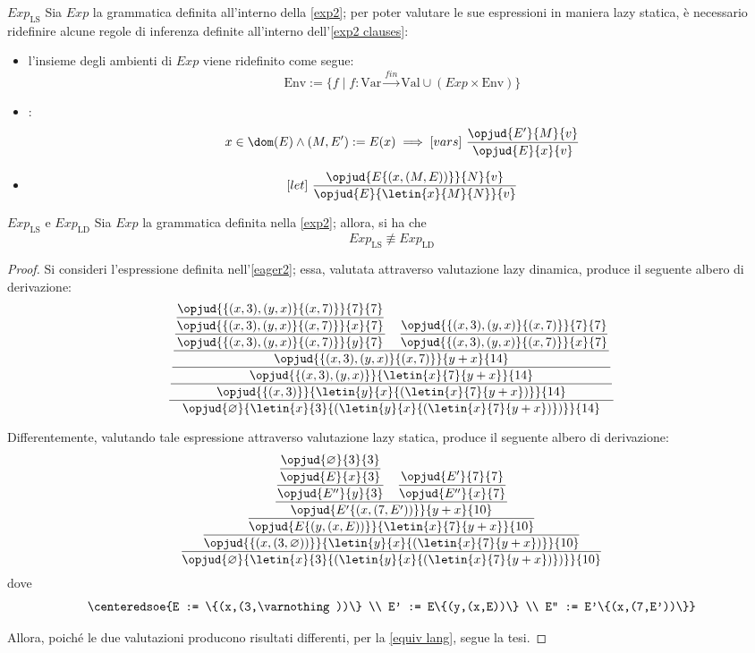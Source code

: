 \documentclass[a4paper, 12pt]{report}
\begin{document}
    \begin{framedprop}[label={exp ls}, breakable]{$Exp_\mathrm{LS}$}
        Sia $Exp$ la grammatica definita all'interno della \cref{exp2}; per poter valutare le sue espressioni in maniera lazy statica, è necessario ridefinire alcune regole di inferenza definite all'interno dell'\cref{exp2 clauses}:

        \begin{itemize}
            \item l'insieme degli ambienti di $Exp$ viene ridefinito come segue: $$\mathrm{Env} := \{f \mid f: \mathrm{Var} \xrightarrow{fin} \mathrm{Val} \cup (Exp \times \mathrm{Env}) \}$$
            \item {}: $$x \in \dom(E) \land (M, E') := E(x) \implies [vars] \ \dfrac{\opjud{E'}{M}{v}}{\opjud{E}{x}{v}}$$
            \item {} $$[let] \ \dfrac{\opjud{E\{(x, (M, E))\}}{N}{v}}{\opjud{E}{\letin{x}{M}{N}}{v}}$$
        \end{itemize}
    \end{framedprop}

    \begin{framedlem}[label={exp ls != exp ld}]{$Exp_\mathrm{LS}$ e $Exp_\mathrm{LD}$}
        Sia $Exp$ la grammatica definita nella \cref{exp2}; allora, si ha che $$Exp_\mathrm{LS} \not\equiv Exp_\mathrm{LD}$$
    \end{framedlem}

    \begin{proof}
        Si consideri l'espressione definita nell'\cref{eager2}; essa, valutata attraverso valutazione lazy dinamica, produce il seguente albero di derivazione: $$\dfrac{\dfrac{\dfrac{\dfrac{\dfrac{\dfrac{\opjud{\{(x,3),(y,x)\}\{(x,7)\}}{7}{7}}{\opjud{\{(x,3),(y,x)\}\{(x,7)\}}{x}{7}}}{\opjud{\{(x,3),(y,x)\}\{(x,7)\}}{y}{7}} \quad \dfrac{\opjud{\{(x,3),(y,x)\}\{(x,7)\}}{7}{7}}{\opjud{\{(x,3),(y,x)\}\{(x,7)\}}{x}{7}}}{\opjud{\{(x,3),(y,x)\}\{(x,7)\}}{y+x}{14}}}{\opjud{\{(x,3),(y,x)\}}{\letin{x}{7}{y+x}}{14}}}{\opjud{\{(x,3)\}}{\letin{y}{x}{(\letin{x}{7}{y+x})}}{14}}}{\opjud{\varnothing}{\letin{x}{3}{(\letin{y}{x}{(\letin{x}{7}{y+x})})}}{14}}$$

        Differentemente, valutando tale espressione attraverso valutazione lazy statica, produce il seguente albero di derivazione: $$\dfrac{\dfrac{\dfrac{\dfrac{\dfrac{\dfrac{\opjud{\varnothing}{3}{3}}{\opjud{E}{x}{3}}}{\opjud{E''}{y}{3}} \quad \dfrac{\opjud{E'}{7}{7}}{\opjud{E''}{x}{7}}}{\opjud{E'\{(x,(7,E'))\}}{y+x}{10}}}{\opjud{E\{(y,(x, E))\}}{\letin{x}{7}{y+x}}{10}}}{\opjud{\{(x,(3,\varnothing))\}}{\letin{y}{x}{(\letin{x}{7}{y+x})}}{10}}}{\opjud{\varnothing}{\letin{x}{3}{(\letin{y}{x}{(\letin{x}{7}{y+x})})}}{10}}$$ dove $$\centeredsoe{E := \{(x,(3,\varnothing))\} \\ E' := E\{(y,(x,E))\} \\ E'' := E'\{(x,(7,E'))\}}$$

        Allora, poiché le due valutazioni producono risultati differenti, per la \cref{equiv lang}, segue la tesi.
    \end{proof}
\end{document}
